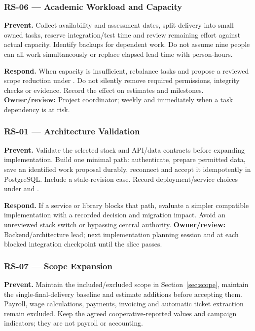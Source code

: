 \subsubsection{RS-06 --- Academic Workload and Capacity}
\textbf{Prevent.} Collect availability and assessment dates, split delivery into
small owned tasks, reserve integration/test time and review remaining effort
against actual capacity. Identify backups for dependent work. Do not assume nine
people can all work simultaneously or replace elapsed lead time with person-hours.

\textbf{Respond.} When capacity is insufficient, rebalance tasks and propose a
reviewed scope reduction under . Do not silently remove
required permissions, integrity checks or evidence. Record the effect on estimates
and milestones. \textbf{Owner/review:} Project coordinator; weekly and immediately
when a task dependency is at risk.

\subsubsection{RS-01 --- Architecture Validation}
\textbf{Prevent.} Validate the selected stack and API/data contracts before expanding
implementation. Build one minimal path: authenticate, prepare permitted data, save
an identified work proposal durably, reconnect and accept it idempotently in
PostgreSQL. Include a stale-revision case. Record deployment/service choices under
 and .

\textbf{Respond.} If a service or library blocks that path, evaluate a simpler
compatible implementation with a recorded decision and migration impact. Avoid an
unreviewed stack switch or bypassing central authority. \textbf{Owner/review:}
Backend/architecture lead; next implementation planning session and at each
blocked integration checkpoint until the slice passes.

\subsubsection{RS-07 --- Scope Expansion}
\textbf{Prevent.} Maintain the included/excluded scope in Section~\ref{sec:scope},
maintain the single-final-delivery baseline and estimate additions before
accepting them. Payroll, wage calculations, payments, invoicing and automatic
ticket extraction remain excluded. Keep the agreed cooperative-reported values
and campaign indicators; they are not payroll or accounting.

